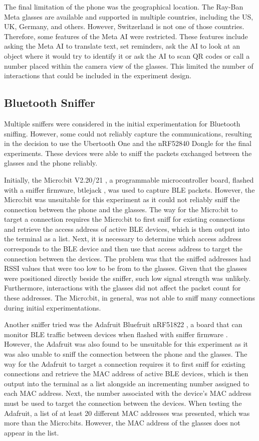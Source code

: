 The final limitation of the phone was the geographical location. The Ray-Ban Meta glasses are available and supported in multiple countries, including the US, UK, Germany, and others. However, Switzerland is not one of those countries. Therefore, some features of the Meta AI were restricted. These features include asking the Meta AI to translate text, set reminders, ask the AI to look at an object where it would try to identify it or ask the AI to scan QR codes or call a number placed within the camera view of the glasses. This limited the number of interactions that could be included in the experiment design.

\subsection*{Bluetooth Sniffer}
Multiple sniffers were considered in the initial experimentation for Bluetooth sniffing. However, some could not reliably capture the communications, resulting in the decision to use the Ubertooth One and the nRF52840 Dongle for the final experiments. These devices were able to sniff the packets exchanged between the glasses and the phone reliably. 

Initially, the Micro:bit V2.20/21 \cite{Microbit}, a programmable microcontroller board, flashed with a sniffer firmware, btlejack \cite{btlejack}, was used to capture BLE packets. However, the Micro:bit was unsuitable for this experiment as it could not reliably sniff the connection between the phone and the glasses. The way for the Micro:bit to target a connection requires the Micro:bit to first sniff for existing connections and retrieve the access address of active BLE devices, which is then output into the terminal as a list. Next, it is necessary to determine which access address corresponds to the BLE device and then use that access address to target the connection between the devices. The problem was that the sniffed addresses had RSSI values that were too low to be from to the glasses. Given that the glasses were positioned directly beside the sniffer, such low signal strength was unlikely. Furthermore, interactions with the glasses did not affect the packet count for these addresses. The Micro:bit, in general, was not able to sniff many connections during initial experimentations.

Another sniffer tried was the Adafruit Bluefruit nRF51822 \cite{BluefruitSniffer}, a board that can monitor BLE traffic between devices when flashed with sniffer firmware \cite{AdafruitBLESnifferPython}. However, the Adafruit was also found to be unsuitable for this experiment as it was also unable to sniff the connection between the phone and the glasses. The way for the Adafruit to target a connection requires it to first sniff for existing connections and retrieve the MAC address of active BLE devices, which is then output into the terminal as a list alongside an incrementing number assigned to each MAC address. Next, the number associated with the device's MAC address must be used to target the connection between the devices. When testing the Adafruit, a list of at least 20 different MAC addresses was presented, which was more than the Micro:bits. However, the MAC address of the glasses does not appear in the list.

